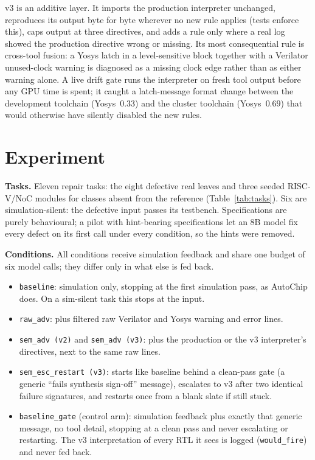 \documentclass[11pt]{article}
\begin{document}
v3 is an additive layer. It imports the production interpreter unchanged,
reproduces its output byte for byte wherever no new rule applies (tests enforce
this), caps output at three directives, and adds a rule only where a real log
showed the production directive wrong or missing. Its most consequential rule
is cross-tool fusion: a Yosys latch in a level-sensitive block together with a
Verilator unused-clock warning is diagnosed as a missing clock edge rather than
as either warning alone. A live drift gate runs the interpreter on fresh tool
output before any GPU time is spent; it caught a latch-message format change
between the development toolchain (Yosys~$0.33$) and the cluster toolchain
(Yosys~$0.69$) that would otherwise have silently disabled the new rules.

\section{Experiment}
\label{sec:exp}

\textbf{Tasks.} Eleven repair tasks: the eight defective real leaves and three
seeded RISC-V/NoC modules for classes absent from the reference
(Table~\ref{tab:tasks}). Six are simulation-silent: the defective input passes
its testbench. Specifications are purely behavioural; a pilot with
hint-bearing specifications let an $8$B model fix every defect on its first
call under every condition, so the hints were removed.

\textbf{Conditions.} All conditions receive simulation feedback and share one
budget of six model calls; they differ only in what else is fed back.
\begin{itemize}[leftmargin=1.2em, itemsep=0.1em]
\item \texttt{baseline}: simulation only, stopping at the first simulation
pass, as AutoChip does. On a sim-silent task this stops at the input.
\item \texttt{raw\_adv}: plus filtered raw Verilator and Yosys warning and
error lines.
\item \texttt{sem\_adv (v2)} and \texttt{sem\_adv (v3)}: plus the production
or the v3 interpreter's directives, next to the same raw lines.
\item \texttt{sem\_esc\_restart (v3)}: starts like baseline behind a
clean-pass gate (a generic ``fails synthesis sign-off'' message), escalates to
v3 after two identical failure signatures, and restarts once from a blank
slate if still stuck.
\item \texttt{baseline\_gate} (control arm): simulation feedback plus exactly
that generic message, no tool detail, stopping at a clean pass and never
escalating or restarting. The v3 interpretation of every RTL it sees is logged
(\texttt{would\_fire}) and never fed back.
\end{itemize}
\end{document}

